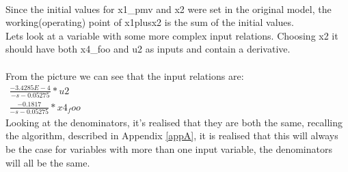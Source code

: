 \setlength\fboxsep{0pt}
\setlength\fboxrule{0.5pt}
\\\newline
Since the initial values for x1\_pmv and x2 were set in the original model, the working(operating) point of x1plusx2 is the sum of the initial values.\\\newline
Lets look at a variable with some more complex input relations. Choosing x2 it should have both x4\_foo and u2 as inputs and contain a derivative.\\\newline
\setlength\fboxsep{0pt}
\setlength\fboxrule{0.5pt}
\\\newline
From the picture we can see that the input relations are:\\
$\begin{array}{rcl} \frac{-3.4285E-4}{-s -0.05275}*u2 \end{array}$\\
$\begin{array}{rcl} \frac{-0.1817}{-s -0.05275}*x4_foo \end{array}$\\\newline
Looking at the denominators, it's realised that they are both the same, recalling the algorithm, described in Appendix \ref{appA}, it is realised that this will always be the case for variables with more than one input variable, the denominators will all be the same.